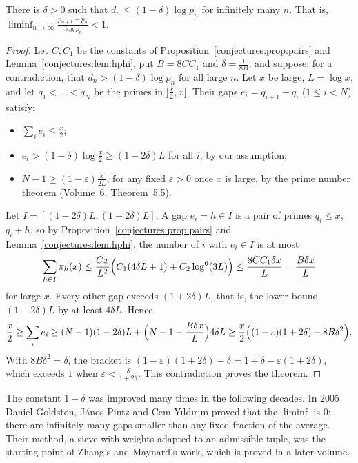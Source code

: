\begin{theorem}[Erd\H{o}s, 1940]\label{conjectures:thm:erdossmall}
There is $\delta>0$ such that $d_n\le(1-\delta)\log p_n$ for infinitely many $n$. That is, $\displaystyle\liminf_{n\to\infty}\frac{p_{n+1}-p_n}{\log p_n}<1$.
\end{theorem}
\begin{proof}
Let $C,C_1$ be the constants of Proposition~\ref{conjectures:prop:pairs} and Lemma~\ref{conjectures:lem:hphi}, put $B=8CC_1$ and $\delta=\frac1{8B}$, and suppose, for a
contradiction, that $d_n>(1-\delta)\log p_n$ for all large $n$. Let $x$ be large, $L=\log x$, and let $q_1<\dots<q_N$ be the primes in $]\frac x2,x]$.
Their gaps $e_i=q_{i+1}-q_i$ ($1\le i<N$) satisfy:
\begin{itemize}
\item $\sum_ie_i\le\frac x2$;
\item $e_i>(1-\delta)\log\frac x2\ge(1-2\delta)L$ for all $i$, by our assumption;
\item $N-1\ge(1-\varepsilon)\frac x{2L}$, for any fixed $\varepsilon>0$ once $x$ is large, by the prime number theorem (Volume~6, Theorem~5.5).
\end{itemize}
Let $I=[(1-2\delta)L,(1+2\delta)L]$. A gap $e_i=h\in I$ is a pair of primes $q_i\le x$, $q_i+h$, so by Proposition~\ref{conjectures:prop:pairs} and
Lemma~\ref{conjectures:lem:hphi}, the number of $i$ with $e_i\in I$ is at most
\[
\sum_{h\in I}\pi_h(x)\le\frac{Cx}{L^2}\Bigl(C_1(4\delta L+1)+C_2\log^6(3L)\Bigr)\le\frac{8CC_1\delta x}L=\frac{B\delta x}L
\]
for large $x$. Every other gap exceeds $(1+2\delta)L$, that is, the lower bound $(1-2\delta)L$ by at least $4\delta L$. Hence
\[
\frac x2\ge\sum_ie_i\ge(N-1)(1-2\delta)L+\Bigl(N-1-\frac{B\delta x}L\Bigr)4\delta L\ge\frac x2\Bigl((1-\varepsilon)(1+2\delta)-8B\delta^2\Bigr).
\]
With $8B\delta^2=\delta$, the bracket is $(1-\varepsilon)(1+2\delta)-\delta=1+\delta-\varepsilon(1+2\delta)$, which exceeds $1$ when $\varepsilon<\frac\delta{1+2\delta}$.
This contradiction proves the theorem.
\end{proof}

The constant $1-\delta$ was improved many times in the following decades. In 2005 Daniel Goldston, J\'anos Pintz and Cem Y\i ld\i r\i m proved that the
$\liminf$ is $0$: there are infinitely many gaps smaller than any fixed fraction of the average. Their method, a sieve with weights adapted to an
admissible tuple, was the starting point of Zhang's and Maynard's work, which is proved in a later volume.

